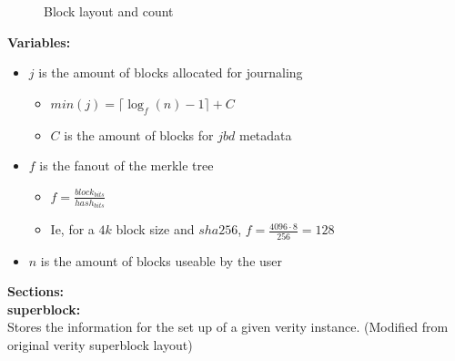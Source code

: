 \documentclass[letter,12pt,portrait]{article}
\begin{document}
\begin{figure}
    \centering
    \caption{Block layout and count} \label{fig:blocks}
\end{figure}
\noindent\textbf{Variables:}
\begin{itemize}
    \item $j$ is the amount of blocks allocated for journaling
        \begin{itemize}
            \item $min(j) = \lceil\log_f(n)-1\rceil + C$
            \item $C$ is the amount of blocks for $jbd$ metadata
        \end{itemize}
    \item $f$ is the fanout of the merkle tree
        \begin{itemize}
            \item $f = \frac{block_{bits}}{hash_{bits}}$
            \item Ie, for a $4k$ block size and $sha256$, $f = \frac{4096 \cdot 8}{256} = 128$
        \end{itemize}
    \item $n$ is the amount of blocks useable by the user
\end{itemize}
\noindent\textbf{Sections:}\\
\textbf{superblock:}\\
Stores the information for the set up of a given verity instance. (Modified from original verity superblock layout)\\
\end{document}

